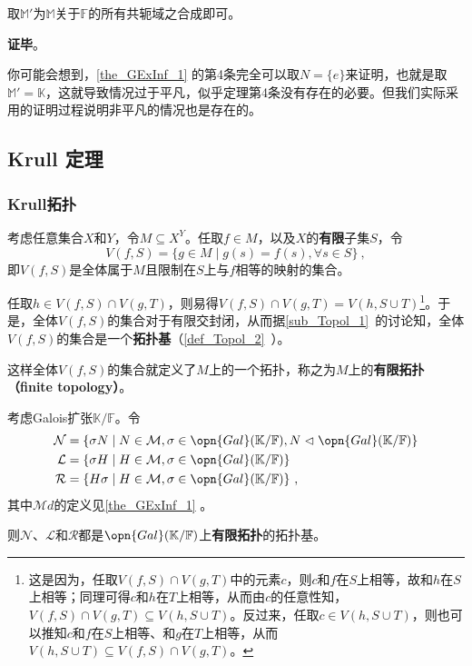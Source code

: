取$\mathbb{M}'$为$\mathbb{M}$关于$\mathbb{F}$的所有共轭域之合成即可。

\textbf{证毕}。

你可能会想到，\autoref{the_GExInf_1} 的第4条完全可以取$N=\{e\}$来证明，也就是取$\mathbb{M}'=\mathbb{K}$，这就导致情况过于平凡，似乎定理第4条没有存在的必要。但我们实际采用的证明过程说明非平凡的情况也是存在的。





\subsection{Krull 定理}\label{sub_GExInf_1}


\subsubsection{Krull拓扑}

考虑任意集合$X$和$Y$，令$M\subseteq X^Y$。任取$f\in M$，以及$X$的\textbf{有限}子集$S$，令
\begin{equation}
V(f, S) = \{g\in M\mid g(s)=f(s), \forall s\in S\}~,
\end{equation}
即$V(f, S)$是全体属于$M$且限制在$S$上与$f$相等的映射的集合。

任取$h\in V(f, S)\cap V(g, T)$，则易得$V(f, S)\cap V(g, T) = V(h, S\cup T)$\footnote{这是因为，任取$V(f, S)\cap V(g, T)$中的元素$c$，则$c$和$f$在$S$上相等，故和$h$在$S$上相等；同理可得$c$和$h$在$T$上相等，从而由$c$的任意性知，$V(f, S)\cap V(g, T)\subseteq V(h, S\cup T)$。反过来，任取$c\in V(h, S\cup T)$，则也可以推知$c$和$f$在$S$上相等、和$g$在$T$上相等，从而$V(h, S\cup T)\subseteq V(f, S)\cap V(g, T)$。}。于是，全体$V(f, S)$的集合对于有限交封闭，从而据\autoref{sub_Topol_1}~的讨论知，全体$V(f, S)$的集合是一个\textbf{拓扑基}（\autoref{def_Topol_2}~）。

这样全体$V(f, S)$的集合就定义了$M$上的一个拓扑，称之为$M$上的\textbf{有限拓扑（finite topology）}。



\begin{theorem}{}\label{the_GExInf_2}
考虑Galois扩张$\mathbb{K}/\mathbb{F}$。令
\begin{equation}\label{eq_GExInf_1}
\begin{aligned}
\mathcal{N} &= \{\sigma N\mid N\in\mathcal{M}, \sigma\in\opn{Gal}(\mathbb{K}/\mathbb{F}), N\vartriangleleft\opn{Gal}(\mathbb{K}/\mathbb{F})\}\\
\mathcal{L} &= \{\sigma H\mid H\in\mathcal{M}, \sigma\in\opn{Gal}(\mathbb{K}/\mathbb{F})\}\\
\mathcal{R} &= \{H\sigma \mid H\in\mathcal{M}, \sigma\in\opn{Gal}(\mathbb{K}/\mathbb{F})\}~,
\end{aligned}
\end{equation}
其中$\mathcal{M}d$的定义见\autoref{the_GExInf_1} 。

则$\mathcal{N}$、$\mathcal{L}$和$\mathcal{R}$都是$\opn{Gal}(\mathbb{K}/\mathbb{F})$上\textbf{有限拓扑}的拓扑基。
\end{theorem}

